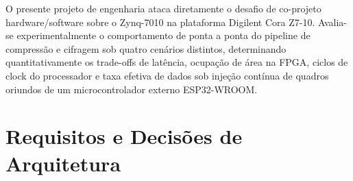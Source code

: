 \documentclass[11pt,a4paper]{article}
\begin{document}
O presente projeto de engenharia ataca diretamente o desafio de co-projeto hardware/software sobre o Zynq-7010 na plataforma Digilent Cora Z7-10. Avalia-se experimentalmente o comportamento de ponta a ponta do pipeline de compressão e cifragem sob quatro cenários distintos, determinando quantitativamente os trade-offs de latência, ocupação de área na FPGA, ciclos de clock do processador e taxa efetiva de dados sob injeção contínua de quadros oriundos de um microcontrolador externo ESP32-WROOM.

\section{Requisitos e Decisões de Arquitetura}
\end{document}
